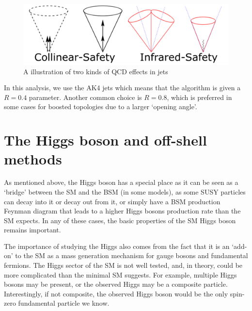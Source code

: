 \begin{figure}[htb]
\begin{center}
\includegraphics[width=.85\linewidth]{fig/jet_split.png}
\end{center}
\caption{A illustration of two kinds of QCD effects in jets\protect\footnotemark}
\label{fig:jet_split}
\end{figure}

In this analysis, we use the AK4 jets which means that the algorithm is given a $R=0.4$ parameter. Another
common choice is $R=0.8$, which is preferred in some cases for boosted topologies due to a larger `opening
angle'.

\section{The Higgs boson and off-shell methods}\label{sec:physics_offshell}


As mentioned above, the Higgs boson has a special place as it can be seen as a `bridge' between
the SM and the BSM (in some models), as some SUSY particles can decay into it or decay out from it, 
or simply have a BSM production Feynman diagram that leads to a higher Higgs
bosons production rate than the SM expects. In any of these cases, the basic properties of the SM Higgs
boson remains important.

The importance of studying the Higgs also comes from the fact that it is an `add-on' to the SM as
a mass generation mechanism for gauge bosons and fundamental fermions. The Higgs sector of the SM is not well tested, 
and, in theory, could be more complicated than the minimal SM suggests. For example, multiple Higgs bosons
may be present,
or the observed Higgs may be a composite particle. Interestingly, if not composite, the observed Higgs boson would be the only
spin-zero fundamental particle we know.


